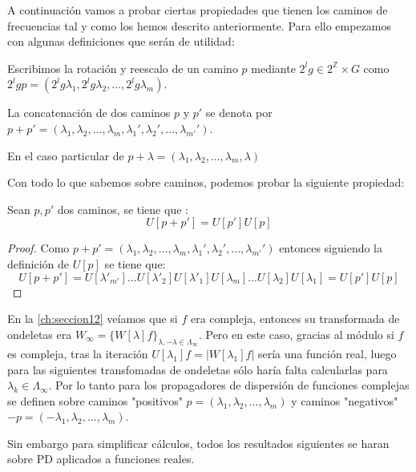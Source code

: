 \noindent A continuación vamos a probar ciertas propiedades que tienen los caminos de frecuencias tal y como los hemos descrito anteriormente. Para ello empezamos con algunas definiciones que serán de utilidad:

\begin{definicion}
Escribimos la rotación y reescalo de un camino $p$ mediante $2^lg \in 2^\mathbb{Z}\times G$ como $2^lgp=(2^lg\lambda_1,2^lg\lambda_2,...,2^lg\lambda_m)$.
\end{definicion}

\begin{definicion}
La concatenación de dos caminos $p$ y $p'$ se denota por $p+p'=(\lambda_1,\lambda_2,...,\lambda_m,\lambda_1',\lambda_2',...,\lambda_{m'}')$. 

En el caso particular de $p+\lambda=(\lambda_1,\lambda_2,...,\lambda_m,\lambda)$
\end{definicion}

\noindent Con todo lo que sabemos sobre caminos, podemos probar la siguiente propiedad: 

\begin{proposicion} \label{proposicionSumaCaminos}
Sean $p, p'$ dos caminos, se tiene que :
$$U[p+p']=U[p']U[p]$$
\end{proposicion}

\begin{proof}
Como $p+p'=(\lambda_1,\lambda_2,...,\lambda_m,\lambda_1',\lambda_2',...,\lambda_{m'}')$ entonces siguiendo la definición de $U[p]$ se tiene que: 
$$U[p+p']=U[\lambda'_{m'}]...U[\lambda'_2]U[\lambda'_1]U[\lambda_{m}]...U[\lambda_2]U[\lambda_1]=U[p']U[p]$$ \qedhere
\end{proof}

\medskip

\noindent En la \autoref{ch:seccion12} veíamos que si $f$ era compleja, entonces su transformada de ondeletas era $ W_\infty=\lbrace W[\lambda]f \rbrace_{\lambda , -\lambda  \in \Lambda_{\infty} }$. Pero en este caso, gracias al módulo si $f$ es compleja, tras la iteración $U[\lambda_1]f=\left|W[\lambda_1]f\right|$ sería una función real, luego para las siguientes transfomadas de ondeletas sólo haría falta calcularlas para $\lambda_k \in \Lambda_\infty$. Por lo tanto para los propagadores de dispersión de funciones complejas se definen sobre caminos "positivos" $p=(\lambda_1,\lambda_2, ... , \lambda_m)$ y caminos "negativos" $-p=(-\lambda_1,\lambda_2, ... , \lambda_m)$.

\medskip

\noindent Sin embargo para simplificar cálculos, todos los resultados siguientes se haran sobre PD aplicados a funciones reales.

